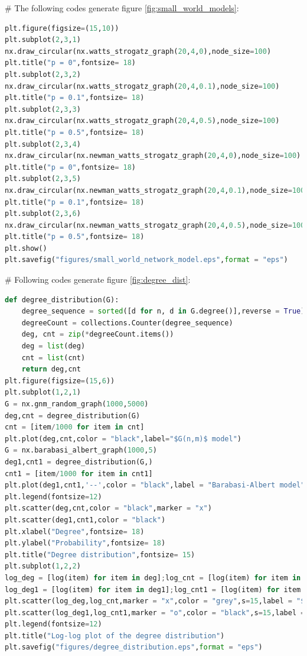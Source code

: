\documentclass[12pt]{article}
\begin{document}
\noindent
\newline
\# The following codes generate figure \ref{fig:small_world_models}:
\begin{lstlisting}[breaklines=true,language=Python]
plt.figure(figsize=(15,10))
plt.subplot(2,3,1)
nx.draw_circular(nx.watts_strogatz_graph(20,4,0),node_size=100)
plt.title("p = 0",fontsize= 18)
plt.subplot(2,3,2)
nx.draw_circular(nx.watts_strogatz_graph(20,4,0.1),node_size=100)
plt.title("p = 0.1",fontsize= 18)
plt.subplot(2,3,3)
nx.draw_circular(nx.watts_strogatz_graph(20,4,0.5),node_size=100)
plt.title("p = 0.5",fontsize= 18)
plt.subplot(2,3,4)
nx.draw_circular(nx.newman_watts_strogatz_graph(20,4,0),node_size=100)
plt.title("p = 0",fontsize= 18)
plt.subplot(2,3,5)
nx.draw_circular(nx.newman_watts_strogatz_graph(20,4,0.1),node_size=100)
plt.title("p = 0.1",fontsize= 18)
plt.subplot(2,3,6)
nx.draw_circular(nx.newman_watts_strogatz_graph(20,4,0.5),node_size=100)
plt.title("p = 0.5",fontsize= 18)
plt.show()
plt.savefig("figures/small_world_network_model.eps",format = "eps")
\end{lstlisting}
\noindent
\newline
\# Following codes generate figure \ref{fig:degree_dist}:
\begin{lstlisting}[breaklines=true,language=Python]
def degree_distribution(G):
    degree_sequence = sorted([d for n, d in G.degree()],reverse = True)
    degreeCount = collections.Counter(degree_sequence)
    deg, cnt = zip(*degreeCount.items())
    deg = list(deg)
    cnt = list(cnt)
    return deg,cnt
plt.figure(figsize=(15,6))
plt.subplot(1,2,1)
G = nx.gnm_random_graph(1000,5000)
deg,cnt = degree_distribution(G)
cnt = [item/1000 for item in cnt]
plt.plot(deg,cnt,color = "black",label="$G(n,m)$ model")
G = nx.barabasi_albert_graph(1000,5)
deg1,cnt1 = degree_distribution(G,)
cnt1 = [item/1000 for item in cnt1]
plt.plot(deg1,cnt1,'--',color = "black",label = "Barabasi-Albert model")
plt.legend(fontsize=12)
plt.scatter(deg,cnt,color = "black",marker = "x")
plt.scatter(deg1,cnt1,color = "black")
plt.xlabel("Degree",fontsize= 18)
plt.ylabel("Probability",fontsize= 18)
plt.title("Degree distribution",fontsize= 15)
plt.subplot(1,2,2)
log_deg = [log(item) for item in deg];log_cnt = [log(item) for item in cnt]
log_deg1 = [log(item) for item in deg1];log_cnt1 = [log(item) for item in cnt1]
plt.scatter(log_deg,log_cnt,marker = "x",color = "grey",s=15,label = "$G(n,m) model$")
plt.scatter(log_deg1,log_cnt1,marker = "o",color = "black",s=15,label = "Barabasi-Albert model")
plt.legend(fontsize=12)
plt.title("Log-log plot of the degree distribution")
plt.savefig("figures/degree_distribution.eps",format = "eps")
\end{lstlisting}
\end{document}
